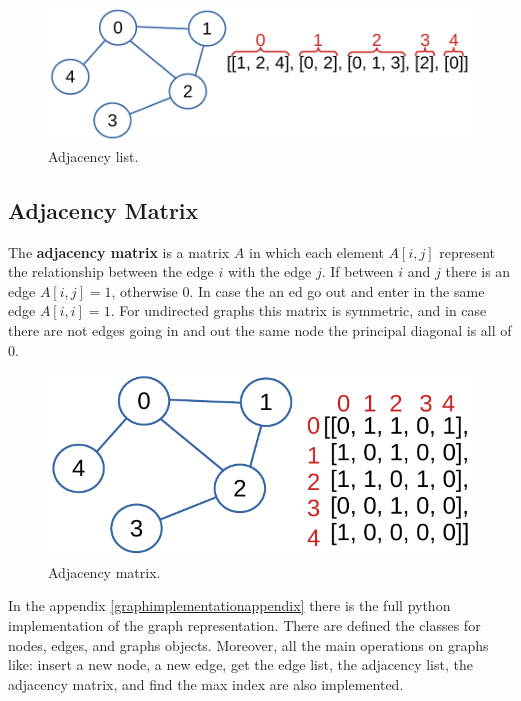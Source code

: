\begin{figure}[H]
	\begin{center}
		\includegraphics[scale=.6]{chapters/graphs/images/graphs_4.pdf}
		\caption[Adjacency list.]{Adjacency list.}
		\label{graphs_4}
	\end{center}
\end{figure}

\subsection{Adjacency Matrix}
The \textbf{adjacency matrix} is a matrix \(A\) in which each element \(A[i, j]\) represent the relationship between the edge \(i\) with the edge \(j\). If between \(i\) and \(j\) there is an edge \(A[i, j] = 1\), otherwise \(0\). In case the an ed go out and enter in the same edge \(A[i, i] = 1\). For undirected graphs this matrix is symmetric, and in case there are not edges going in and out the same node the principal diagonal is all of \(0\).

\begin{figure}[H]
	\begin{center}
		\includegraphics[scale=.6]{chapters/graphs/images/graphs_5.pdf}
		\caption[Adjacency matrix.]{Adjacency matrix.}
		\label{graphs_5}
	\end{center}
\end{figure}

In the appendix \ref{graphimplementationappendix} there is the full python implementation of the graph representation. There are defined the classes for nodes, edges, and graphs objects. Moreover, all the main operations on graphs like: insert a new node, a new edge, get the edge list, the adjacency list, the adjacency matrix, and find the max index are also implemented.

